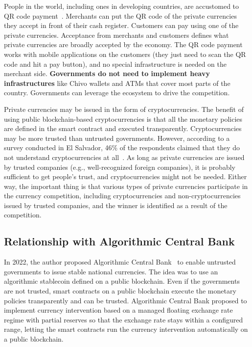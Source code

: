 \documentclass[dvipdfmx,a4paper]{article}
\begin{document}
People in the world, including ones in developing countries, are accustomed to QR code payment~\cite{yan2021qr}. Merchants can put the QR code of the private currencies they accept in front of their cash register. Customers can pay using one of the private currencies. Acceptance from merchants and customers defines what private currencies are broadly accepted by the economy. The QR code payment works with mobile applications on the customers (they just need to scan the QR code and hit a pay button), and no special infrastructure is needed on the merchant side. \textbf{Governments do not need to implement heavy infrastructures} like Chivo wallets and ATMs that cover most parts of the country. Governments can leverage the ecosystem to drive the competition.

Private currencies may be issued in the form of cryptocurrencies. The benefit of using public blockchain-based cryptocurrencies is that all the monetary policies are defined in the smart contract and executed transparently. Cryptocurrencies may be more trusted than untrusted governments. However, according to a survey conducted in El Salvador, 46\% of the respondents claimed that they do not understand cryptocurrencies at all~\cite{alonso2023salvador}. As long as private currencies are issued by trusted companies (e.g., well-recognized foreign companies), it is probably sufficient to get people's trust, and cryptocurrencies might not be needed. Either way, the important thing is that various types of private currencies participate in the currency competition, including cryptocurrencies and non-cryptocurrencies issued by trusted companies, and the winner is identified as a result of the competition.

\subsection{Relationship with Algorithmic Central Bank}

In 2022, the author proposed Algorithmic Central Bank~\cite{hara2021johnlawcoin,hara2021acb} to enable untrusted governments to issue stable national currencies. The idea was to use an algorithmic stablecoin defined on a public blockchain. Even if the governments are not trusted, smart contracts on a public blockchain execute the monetary policies transparently and can be trusted. Algorithmic Central Bank proposed to implement currency intervention based on a managed floating exchange rate regime with partial reserves so that the exchange rate stays within a configured range, letting the smart contracts run the currency intervention automatically on a public blockchain.
\end{document}
